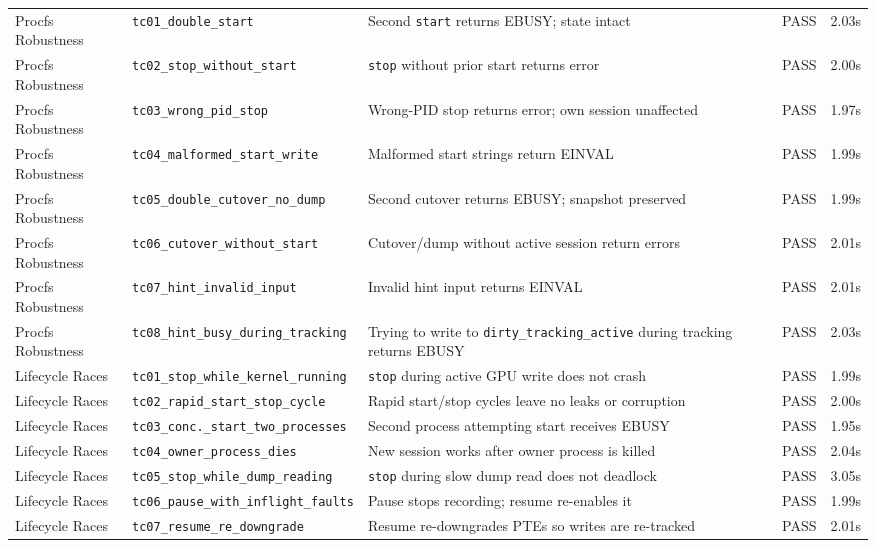 \begin{center}
\begin{longtable}{>{\raggedright\arraybackslash}p{2.0cm} >{\raggedright\arraybackslash}p{4.5cm} >{\raggedright\arraybackslash}p{6.2cm} >{\raggedright\arraybackslash}p{1.0cm} >{\raggedright\arraybackslash}p{1.1cm}}
Procfs Robustness & \texttt{tc01\_double\_start} & Second \texttt{start} returns EBUSY; state intact & PASS & 2.03s \\
Procfs Robustness & \texttt{tc02\_stop\_without\_start} & \texttt{stop} without prior start returns error & PASS & 2.00s \\
Procfs Robustness & \texttt{tc03\_wrong\_pid\_stop} & Wrong-PID stop returns error; own session unaffected & PASS & 1.97s \\
Procfs Robustness & \texttt{tc04\_malformed\_start\_write} & Malformed start strings return EINVAL & PASS & 1.99s \\
Procfs Robustness & \texttt{tc05\_double\_cutover\_no\_dump} & Second cutover returns EBUSY; snapshot preserved & PASS & 1.99s \\
Procfs Robustness & \texttt{tc06\_cutover\_without\_start} & Cutover/dump without active session return errors & PASS & 2.01s \\
Procfs Robustness & \texttt{tc07\_hint\_invalid\_input} & Invalid hint input returns EINVAL & PASS & 2.01s \\
Procfs Robustness & \texttt{tc08\_hint\_busy\_during\_tracking} & Trying to write to \texttt{dirty\_tracking\_active} during tracking returns EBUSY & PASS & 2.03s \\
\midrule

Lifecycle Races & \texttt{tc01\_stop\_while\_kernel\_running} & \texttt{stop} during active GPU write does not crash & PASS & 1.99s \\
Lifecycle Races & \texttt{tc02\_rapid\_start\_stop\_cycle} & Rapid start/stop cycles leave no leaks or corruption & PASS & 2.00s \\
Lifecycle Races & \texttt{tc03\_conc.\_start\_two\_processes} & Second process attempting start receives EBUSY & PASS & 1.95s \\
Lifecycle Races & \texttt{tc04\_owner\_process\_dies} & New session works after owner process is killed & PASS & 2.04s \\
Lifecycle Races & \texttt{tc05\_stop\_while\_dump\_reading} & \texttt{stop} during slow dump read does not deadlock & PASS & 3.05s \\
Lifecycle Races & \texttt{tc06\_pause\_with\_inflight\_faults} & Pause stops recording; resume re-enables it & PASS & 1.99s \\
Lifecycle Races & \texttt{tc07\_resume\_re\_downgrade} & Resume re-downgrades PTEs so writes are re-tracked & PASS & 2.01s \\
\midrule


\end{longtable}
\end{center}
